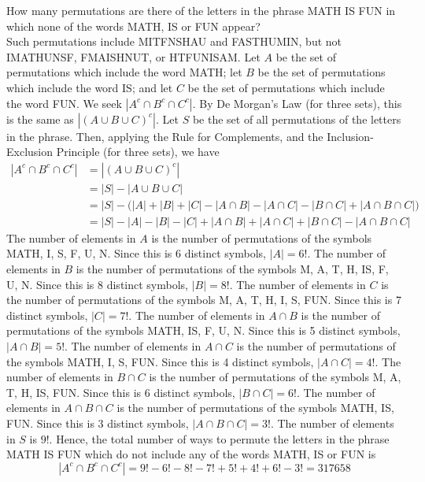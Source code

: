 \documentclass[handout]{ximera}
\begin{document}
\begin{example}[example 3]
How many permutations are there of the letters in the phrase MATH IS FUN in which none of the
words MATH, IS or FUN appear?\\
Such permutations include MITFNSHAU and FASTHUMIN, but not IMATHUNSF, FMAISHNUT, or HTFUNISAM.
Let $A$ be the set of permutations which include the word MATH; let $B$ be the set of permutations which include the word
IS; and let $C$ be the set of permutations which include the word FUN.  We seek $|A^c \cap B^c \cap C^c|$. 
By De Morgan's Law (for three sets), this is the same as $|(A \cup B\cup C)^c|$. 
Let $S$ be the set of all permutations of the letters in the phrase. Then, applying the Rule for Complements,
and the Inclusion-Exclusion Principle (for three sets), we have
\begin{align*}
|A^c \cap B^c \cap C^c| &= |(A \cup B \cup C)^c|\\
               &= |S| - |A\cup B \cup C|\\
               &= |S| - \Big(|A| + |B| + |C| -|A\cap B|-|A\cap C|-|B\cap C|+|A\cap B \cap C|\Big)\\
               &= |S| -|A| - |B| - |C| +|A\cap B|+|A\cap C|+|B\cap C|-|A\cap B \cap C|
\end{align*}
The number of elements in $A$ is the number of permutations of the symbols MATH, I, S, F, U, N.  
Since this is 6 distinct symbols, $|A| = 6!$. 
The number of elements in $B$ is the number of 
permutations of the symbols M, A, T, H, IS, F, U, N.  
Since this is 8 distinct symbols, $|B| = 8!$. 
The number of elements in $C$ is the number of 
permutations of the symbols M, A, T, H, I, S, FUN.  
Since this is 7 distinct symbols, $|C| = 7!$.
The number of elements in $A \cap B$ is the number of permutations of the symbols MATH, IS, F, U, N.  
Since this is 5 distinct symbols, $|A \cap B| = 5!$.
The number of elements in $A \cap C$ is the number of permutations of the symbols MATH, I, S, FUN.  
Since this is 4 distinct symbols, $|A \cap C| = 4!$.
The number of elements in $B \cap C$ is the number of permutations of the symbols M, A, T, H, IS, FUN.  
Since this is 6 distinct symbols, $|B \cap C| = 6!$.
The number of elements in $A \cap B\cap C$ is the number of permutations of the symbols MATH, IS, FUN.  
Since this is 3 distinct symbols, $|A \cap B\cap C| = 3!$.
The number of elements in $S$
is $9!$. Hence, the total number of ways to permute the letters in the phrase MATH IS FUN which do not 
include any of the words MATH, IS or FUN is
\[
|A^c \cap B^c \cap C^c| = 9! - 6! - 8! - 7! + 5! + 4! + 6! -3! = 317658
\]
\end{example}
\end{document}
